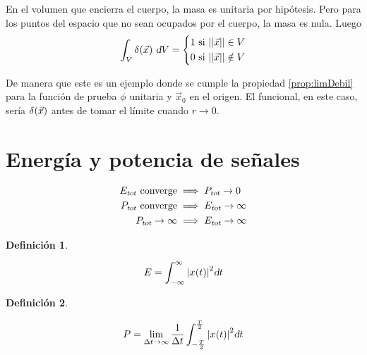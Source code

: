 \documentclass[a5paper,12pt,twoside]{book}
\newtheorem{defn}{{Definición}}[chapter]
\begin{document}
\begin{mdframed}[style=MyFrame2]
    En el volumen que encierra el cuerpo, la masa es unitaria por hipótesis. Pero para los puntos del espacio que no sean ocupados por el cuerpo, la masa es nula. Luego
    \begin{equation*}
        \int_V \fx[\delta]{\Vec{x}} \, \dif V =
        \left\{
        \begin{aligned}
            1 \text{ si } \nnorm{\Vec{x}} \in V
            \\
            0 \text{ si } \nnorm{\Vec{x}} \notin V
        \end{aligned}
        \right.
    \end{equation*}

    De manera que este es un ejemplo donde se cumple la propiedad \ref{prop:limDebil} para la función de prueba $\phi$ unitaria y $\Vec{x}_0$ en el origen. El funcional, en este caso, sería $\fx[\delta]{\Vec{x}}$ antes de tomar el límite cuando $r \to 0$.
\end{mdframed}


\section{Energía y potencia de señales}

\begin{align*}
        \sub{E}{tot} \text{ converge} & \implies \sub{P}{tot} \to 0
        \\
        \sub{P}{tot} \text{ converge} & \implies \sub{E}{tot} \to \infty
        \\
        \sub{P}{tot} \to \infty & \implies \sub{E}{tot} \to \infty
    \end{align*}

\begin{mdframed}[style=MyFrame1]
    \begin{defn}
    \end{defn}
    \begin{equation*}
        E = \int_{-\infty}^{\infty} \norm{\fx[x]{t}}^2 \dif t
    \end{equation*}
\end{mdframed}

\begin{mdframed}[style=MyFrame1]
    \begin{defn}
    \end{defn}
    \begin{equation*}
        P = \lim_{\Delta t \to \infty} \frac{1}{\Delta t} \int_{-\frac{T}{2}}^{\frac{T}{2}} \norm{\fx[x]{t}}^2 \dif t
    \end{equation*}
\end{mdframed}
\end{document}
